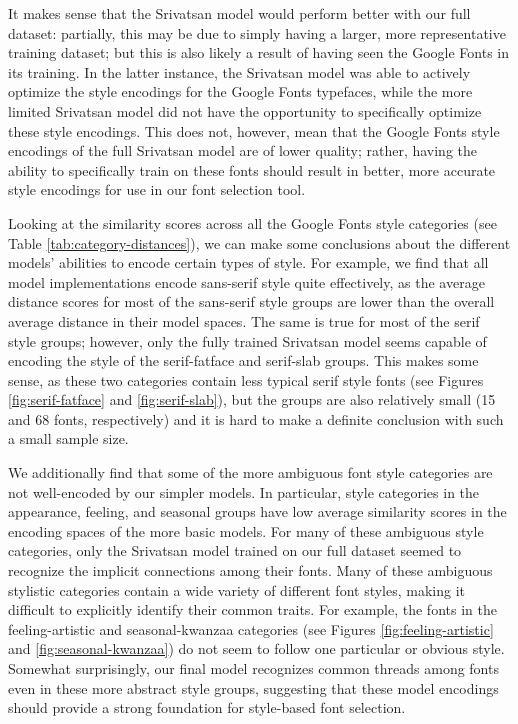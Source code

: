 It makes sense that the Srivatsan model would perform better with our full dataset: partially, this may be due to simply having a larger, more representative training dataset; but this is also likely a result of having seen the Google Fonts in its training. In the latter instance, the Srivatsan model was able to actively optimize the style encodings for the Google Fonts typefaces, while the more limited Srivatsan model did not have the opportunity to specifically optimize these style encodings. This does not, however, mean that the Google Fonts style encodings of the full Srivatsan model are of lower quality; rather, having the ability to specifically train on these fonts should result in better, more accurate style encodings for use in our font selection tool.

Looking at the similarity scores across all the Google Fonts style categories (see Table \ref{tab:category-distances}), we can make some conclusions about the different models' abilities to encode certain types of style. For example, we find that all model implementations encode sans-serif style quite effectively, as the average distance scores for most of the sans-serif style groups are lower than the overall average distance in their model spaces. The same is true for most of the serif style groups; however, only the fully trained Srivatsan model seems capable of encoding the style of the serif-fatface and serif-slab groups. This makes some sense, as these two categories contain less typical serif style fonts (see Figures \ref{fig:serif-fatface} and \ref{fig:serif-slab}), but the groups are also relatively small (15 and 68 fonts, respectively) and it is hard to make a definite conclusion with such a small sample size.

We additionally find that some of the more ambiguous font style categories are not well-encoded by our simpler models. In particular, style categories in the appearance, feeling, and seasonal groups have low average similarity scores in the encoding spaces of the more basic models. For many of these ambiguous style categories, only the Srivatsan model trained on our full dataset seemed to recognize the implicit connections among their fonts. Many of these ambiguous stylistic categories contain a wide variety of different font styles, making it difficult to explicitly identify their common traits. For example, the fonts in the feeling-artistic and seasonal-kwanzaa categories (see Figures \ref{fig:feeling-artistic} and \ref{fig:seasonal-kwanzaa}) do not seem to follow one particular or obvious style. Somewhat surprisingly, our final model recognizes common threads among fonts even in these more abstract style groups, suggesting that these model encodings should provide a strong foundation for style-based font selection.

